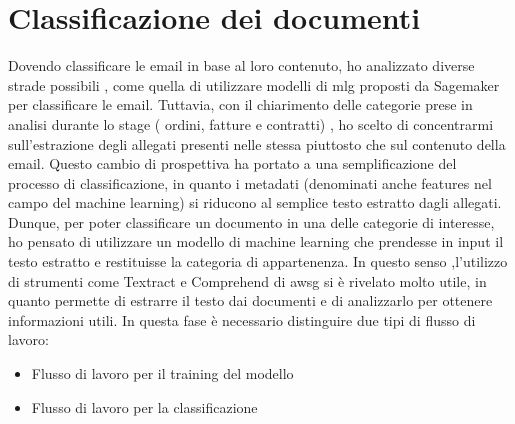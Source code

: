 \section{Classificazione dei documenti}
\label{sec:classificazione-documenti}
Dovendo classificare le email in base al loro contenuto, ho analizzato diverse strade possibili , come quella di utilizzare modelli di \gls{mlg} proposti da Sagemaker per classificare le email. Tuttavia, con il chiarimento delle categorie prese in analisi durante lo stage ( ordini, fatture e contratti) , ho scelto di concentrarmi sull'estrazione degli allegati presenti nelle stessa piuttosto che sul contenuto della email. Questo cambio di prospettiva ha portato a una semplificazione del processo di classificazione, in quanto i metadati (denominati anche features nel campo del machine learning) si riducono al semplice testo estratto dagli allegati. Dunque, per poter classificare un documento in una delle categorie di interesse, ho pensato di utilizzare un modello di machine learning che prendesse in input il testo estratto e restituisse la categoria di appartenenza. In questo senso ,l'utilizzo di strumenti come Textract e Comprehend di \gls{awsg} si è rivelato molto utile, in quanto permette di estrarre il testo dai documenti e di analizzarlo per ottenere informazioni utili.
 In questa fase è necessario distinguire due tipi di flusso di lavoro:
\begin{itemize}
    \item Flusso di lavoro per il training del modello
    \item Flusso di lavoro per la classificazione 
\end{itemize}
